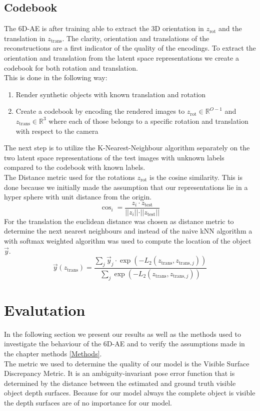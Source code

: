 \documentclass[10pt,a4paper]{article}
\newcommand{\rot}{\ensuremath{\text{rot}\xspace}}
\newcommand{\trans}{\ensuremath{\text{trans}\xspace}}
\begin{document}
\subsection{Codebook}\label{Codebook}
The 6D-AE is after training able to extract the 3D orientation in $z_{\rot}$ and the translation in $z_{\trans}$. The clarity, orientation and translations of the reconstructions are a first indicator of the quality of the encodings. To extract the orientation and translation from the latent space representations we create a codebook for both rotation and translation.\\
This is done in the following way:
\begin{enumerate}
\item Render synthetic objects with known translation and rotation\\
\item Create a codebook by encoding the rendered images to $z_{\rot}\in \mathbb{R}^{O-1}$ and $z_{\trans} \in \mathbb{R}^3$ where each of those belongs to a specific rotation and translation with respect to the camera
\end{enumerate}
The next step is to utilize the K-Nearest-Neighbour algorithm separately on the two latent space representations of the test images with unknown labels compared to the codebook with known labels.\\
The Distance metric used for the rotations $z_{\rot}$ is the cosine similarity. This is done because we initially made the assumption that our representations lie in a hyper sphere with unit distance from the origin.
\begin{equation}
\cos_i = \dfrac{z_i \cdot z_{\text{test}}}{ \vert\vert  z_i \vert \vert \cdot \vert \vert z_{\text{test}} \vert \vert }
\end{equation}
For the translation the euclidean distance was chosen as distance metric to determine the next nearest neighbours and instead of the naive kNN algorithm a with softmax weighted algorithm was used to compute the location of the object $\vec{y}$. 
\begin{equation}
\vec{y}(z_{\trans}) = \dfrac{\sum_j  \vec{y}_j  \cdot  \exp(- L_2(z_{\trans},z_{\trans , j})) }{\sum_j \exp(- L_2(z_{\trans},z_{\trans , j}))}
\end{equation}


\newpage
\section{Evalutation}\label{Evaluation}
In the following section we present our results as well as the methods used to investigate the behaviour of the 6D-AE and to verify the assumptions made in the chapter methods \ref{Methods}.\\
The metric we used to determine the quality of our model is the Visible Surface Discrepancy Metric. It is an ambiguity-invariant pose error function that is determined by the distance between the estimated and ground truth visible object depth surfaces. Because for our model always the complete object is visible the depth surfaces are of no importance for our model. 
\end{document}
